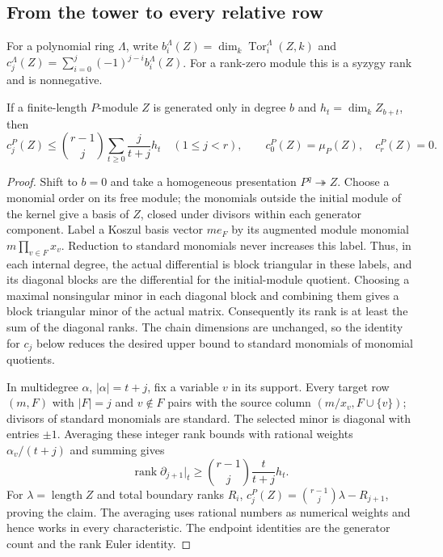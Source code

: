 \subsection{From the tower to every relative row}

For a polynomial ring $\Lambda$, write
$b_i^\Lambda(Z)=\dim_k\operatorname{Tor}_i^\Lambda(Z,k)$ and
$c_j^\Lambda(Z)=\sum_{i=0}^j(-1)^{j-i}b_i^\Lambda(Z)$.
For a rank-zero module this is a syzygy rank and is nonnegative.

\begin{lemma}\label{lem:ordinary-harmonic}
If a finite-length $P$-module $Z$ is generated only in degree $b$ and
$h_t=\dim_kZ_{b+t}$, then
\[
 c_j^P(Z)\le\binom{r-1}{j}\sum_{t\ge0}\frac{j}{t+j}h_t
 \quad(1\le j<r),\qquad c_0^P(Z)=\mu_P(Z),\quad c_r^P(Z)=0.
\]
\end{lemma}

\begin{proof}
Shift to $b=0$ and take a homogeneous presentation
$P^q\twoheadrightarrow Z$. Choose a monomial order on its free module;
the monomials outside the initial module of the kernel give a basis of
$Z$, closed under divisors within each generator component. Label a
Koszul basis vector $m e_F$ by its augmented module monomial
$m\prod_{v\in F}x_v$. Reduction to standard monomials never increases
this label. Thus, in each internal degree, the actual differential is
block triangular in these labels, and its diagonal blocks are the
differential for the initial-module quotient. Choosing a maximal
nonsingular minor in each diagonal block and combining them gives a
block triangular minor of the actual matrix. Consequently its rank is
at least the sum of the diagonal ranks. The chain dimensions are
unchanged, so the identity for $c_j$ below reduces the desired upper
bound to standard monomials of monomial quotients.

In multidegree $\alpha$, $|\alpha|=t+j$, fix a variable $v$ in its support.
Every target row $(m,F)$ with $|F|=j$ and $v\notin F$ pairs with the
source column $(m/x_v,F\cup\{v\})$; divisors of standard monomials are
standard.  The selected minor is diagonal with entries $\pm1$.
Averaging these integer rank bounds with rational weights
$\alpha_v/(t+j)$ and summing gives
\[
 \operatorname{rank}\partial_{j+1}\big|_t\ge
 \binom{r-1}{j}\frac{t}{t+j}h_t.
\]
For $\lambda=\operatorname{length}Z$ and total boundary ranks $R_i$,
$c_j^P(Z)=\binom{r-1}{j}\lambda-R_{j+1}$, proving the claim.
The averaging uses rational numbers as numerical weights and hence
works in every characteristic.  The endpoint identities are the
generator count and the rank Euler identity.
\end{proof}

